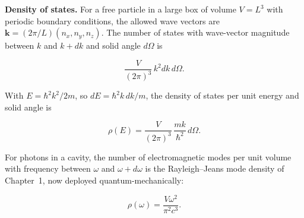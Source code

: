 \medskip\noindent\textbf{Density of states.}
For a free particle in a large box of volume $V = L^{3}$ with periodic boundary conditions, the allowed wave vectors are $\bm k = (2\pi/L)(n_{x},n_{y},n_{z})$. The number of states with wave-vector magnitude between $k$ and $k+dk$ and solid angle $d\Omega$ is
\begin{linenomath}
\begin{equation*}
\frac{V}{(2\pi)^{3}}\,k^{2}dk\,d\Omega.
\end{equation*}
\end{linenomath}
With $E = \hbar^{2}k^{2}/2m$, so $dE = \hbar^{2}k\,dk/m$, the density of states per unit energy and solid angle is
\begin{linenomath}
\begin{equation}
\rho(E) = \frac{V}{(2\pi)^{3}}\,\frac{mk}{\hbar^{2}}\,d\Omega.
\label{eq:density-of-states-free}
\end{equation}
\end{linenomath}
For photons in a cavity, the number of electromagnetic modes per unit volume with frequency between $\omega$ and $\omega+d\omega$ is the Rayleigh--Jeans mode density of Chapter~1, now deployed quantum-mechanically:
\begin{linenomath}
\begin{equation*}
\rho(\omega) = \frac{V\omega^{2}}{\pi^{2}c^{3}}.
\end{equation*}
\end{linenomath}

